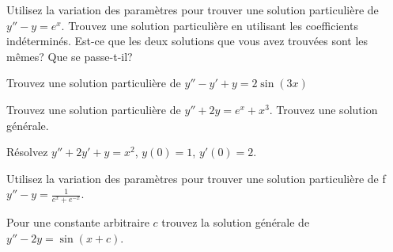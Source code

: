 \begin{exercise} \label{exercise:diffvarparunder}
\pagebreak[2]
\leavevmode
\begin{tasks}
\task Utilisez la variation des paramètres pour trouver une solution particulière de 
$y''-y = e^x$.
\task Trouvez une solution particulière en utilisant les coefficients indéterminés. 
\task Est-ce que les deux solutions que vous avez trouvées sont les mêmes?
Que se passe-t-il?
\end{tasks}
\end{exercise}

\setcounter{exercise}{100}

\begin{exercise}
Trouvez une solution particulière de $y''-y'+y=2\sin(3x)$
\end{exercise}

\begin{samepage}
\begin{exercise}
\leavevmode
\begin{tasks}
\task Trouvez une solution particulière de $y''+2y=e^x + x^3$.
\task Trouvez une solution générale.
\end{tasks}
\end{exercise}
\end{samepage}

\begin{exercise}
Résolvez $y''+2y'+y = x^2$, $y(0)=1$, $y'(0)=2$.
\end{exercise}

\begin{exercise}
Utilisez la variation des paramètres pour trouver une solution particulière de f $y''-y = \frac{1}{e^x+e^{-x}}$.
\end{exercise}

\begin{exercise}
Pour une constante arbitraire $c$ trouvez la solution générale de
 $y''-2y=\sin(x+c)$.
\end{exercise}



